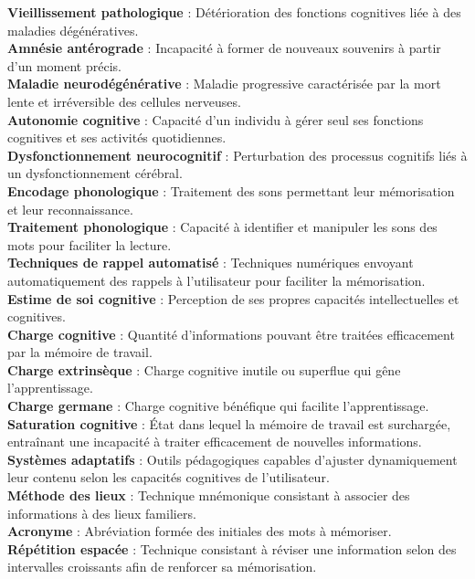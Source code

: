\documentclass[11pt,a4paper]{report}
\begin{document}
\textbf{Vieillissement pathologique} : Détérioration des fonctions cognitives liée à des maladies dégénératives.\\
\textbf{Amnésie antérograde} : Incapacité à former de nouveaux souvenirs à partir d’un moment précis.\\
\textbf{Maladie neurodégénérative} : Maladie progressive caractérisée par la mort lente et irréversible des cellules nerveuses.\\
\textbf{Autonomie cognitive} : Capacité d’un individu à gérer seul ses fonctions cognitives et ses activités quotidiennes.\\
\textbf{Dysfonctionnement neurocognitif} : Perturbation des processus cognitifs liés à un dysfonctionnement cérébral.\\
\textbf{Encodage phonologique} : Traitement des sons permettant leur mémorisation et leur reconnaissance.\\
\textbf{Traitement phonologique} : Capacité à identifier et manipuler les sons des mots pour faciliter la lecture.\\
\textbf{Techniques de rappel automatisé} : Techniques numériques envoyant automatiquement des rappels à l’utilisateur pour faciliter la mémorisation.\\
\textbf{Estime de soi cognitive} : Perception de ses propres capacités intellectuelles et cognitives.\\
\textbf{Charge cognitive} : Quantité d'informations pouvant être traitées efficacement par la mémoire de travail.\\
\textbf{Charge extrinsèque} : Charge cognitive inutile ou superflue qui gêne l’apprentissage.\\
\textbf{Charge germane} : Charge cognitive bénéfique qui facilite l’apprentissage.\\
\textbf{Saturation cognitive} : État dans lequel la mémoire de travail est surchargée, entraînant une incapacité à traiter efficacement de nouvelles informations.\\
\textbf{Systèmes adaptatifs} : Outils pédagogiques capables d'ajuster dynamiquement leur contenu selon les capacités cognitives de l’utilisateur.\\
\textbf{Méthode des lieux} : Technique mnémonique consistant à associer des informations à des lieux familiers.\\
\textbf{Acronyme} : Abréviation formée des initiales des mots à mémoriser.\\
\textbf{Répétition espacée} : Technique consistant à réviser une information selon des intervalles croissants afin de renforcer sa mémorisation.\\
\end{document}
